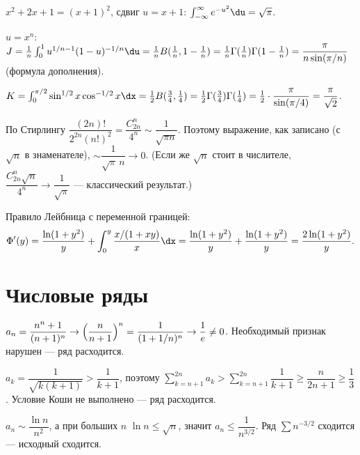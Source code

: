\sol $x^2+2x+1=(x+1)^2$, сдвиг $u=x+1$: $\int_{-\infty}^\infty e^{-u^2}\du=\sqrt\pi$.

\sol $u=x^n$: $J=\tfrac1n\int_0^1 u^{1/n-1}(1-u)^{-1/n}\du=\tfrac1n B(\tfrac1n,1-\tfrac1n)
=\tfrac1n\Gamma(\tfrac1n)\Gamma(1-\tfrac1n)=\dfrac{\pi}{n\sin(\pi/n)}$ (формула дополнения).

\sol $K=\int_0^{\pi/2}\sin^{1/2}x\cos^{-1/2}x\dx=\tfrac12 B(\tfrac34,\tfrac14)
=\tfrac12\Gamma(\tfrac34)\Gamma(\tfrac14)=\tfrac12\cdot\dfrac{\pi}{\sin(\pi/4)}=\dfrac{\pi}{\sqrt2}$.

\sol По Стирлингу $\dfrac{(2n)!}{2^{2n}(n!)^2}=\dfrac{C_{2n}^n}{4^n}\sim\dfrac1{\sqrt{\pi n}}$.
Поэтому выражение, как записано (с $\sqrt n$ в знаменателе), $\sim\dfrac1{\sqrt\pi\,n}\to0$. (Если же
$\sqrt n$ стоит в числителе, $\dfrac{C_{2n}^n\sqrt n}{4^n}\to\dfrac1{\sqrt\pi}$ — классический
результат.)

\sol Правило Лейбница с переменной границей:
\[
  \Phi'(y)=\frac{\ln(1+y^2)}{y}+\int_0^y\frac{x/(1+xy)}{x}\dx
  =\frac{\ln(1+y^2)}{y}+\frac{\ln(1+y^2)}{y}=\frac{2\ln(1+y^2)}{y}.
\]

\section{Числовые ряды}

\sol $a_n=\dfrac{n^n+1}{(n+1)^n}\to\Bigl(\dfrac{n}{n+1}\Bigr)^n=\dfrac1{(1+1/n)^n}\to\dfrac1e\ne0$.
Необходимый признак нарушен — ряд расходится.

\sol $a_k=\dfrac1{\sqrt{k(k+1)}}>\dfrac1{k+1}$, поэтому
$\sum_{k=n+1}^{2n}a_k>\sum_{k=n+1}^{2n}\dfrac1{k+1}\ge\dfrac{n}{2n+1}\ge\dfrac13$. Условие Коши не
выполнено — ряд расходится.

\sol $a_n\sim\dfrac{\ln n}{n^2}$, а при больших $n$ $\ln n\le\sqrt n$, значит
$a_n\le\dfrac1{n^{3/2}}$. Ряд $\sum n^{-3/2}$ сходится — исходный сходится.

